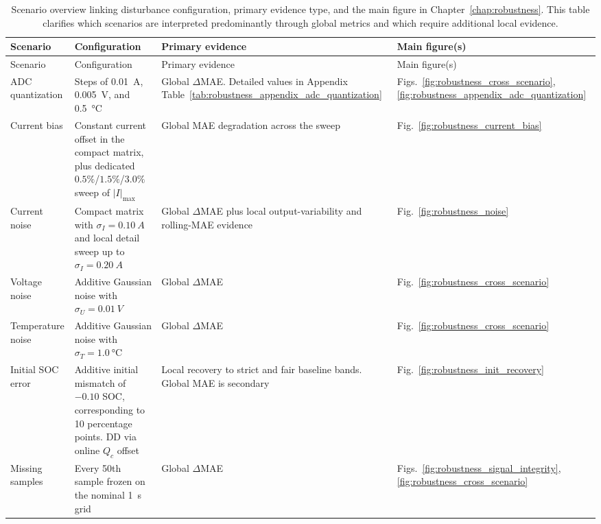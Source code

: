 \documentclass[
    a4paper,
    12pt,
    titlepage,
    bibliography=totoc,
    twoside=on,
    parskip=false,
    numbers=noenddot,
    cleardoublepage=empty,
    DIV=12,
    BCOR=12.0mm,
    headheight=36pt,
    headings=openright
]{scrreprt}
\begin{document}
\begingroup\small
\begin{longtable}{>{\raggedright\arraybackslash}p{2.2cm}>{\raggedright\arraybackslash}p{3.6cm}>{\raggedright\arraybackslash}p{4.4cm}>{\raggedright\arraybackslash}p{3.0cm}}
\caption[Robustness scenario evidence map.]{Scenario overview linking disturbance configuration, primary evidence type, and the main figure in Chapter~\ref{chap:robustness}. This table clarifies which scenarios are interpreted predominantly through global metrics and which require additional local evidence.}\label{tab:robustness_appendix_scenario_overview}\\
\toprule
Scenario & Configuration & Primary evidence & Main figure(s) \\
\midrule
\endfirsthead
\toprule
Scenario & Configuration & Primary evidence & Main figure(s) \\
\midrule
\endhead
ADC quantization & Steps of \SI{0.01}{A}, \SI{0.005}{V}, and \SI{0.5}{\celsius} & Global $\Delta$MAE. Detailed values in Appendix Table~\ref{tab:robustness_appendix_adc_quantization} & Figs.~\ref{fig:robustness_cross_scenario}, \ref{fig:robustness_appendix_adc_quantization} \\
Current bias & Constant current offset in the compact matrix, plus dedicated $0.5\%$/$1.5\%$/$3.0\%$ sweep of $|I|_{\max}$ & Global MAE degradation across the sweep & Fig.~\ref{fig:robustness_current_bias} \\
Current noise & Compact matrix with $\sigma_I=\SI{0.10}{A}$ and local detail sweep up to $\sigma_I=\SI{0.20}{A}$ & Global $\Delta$MAE plus local output-variability and rolling-MAE evidence & Fig.~\ref{fig:robustness_noise} \\
Voltage noise & Additive Gaussian noise with $\sigma_U=\SI{0.01}{V}$ & Global $\Delta$MAE & Fig.~\ref{fig:robustness_cross_scenario} \\
Temperature noise & Additive Gaussian noise with $\sigma_T=\SI{1.0}{\celsius}$ & Global $\Delta$MAE & Fig.~\ref{fig:robustness_cross_scenario} \\
Initial SOC error & Additive initial mismatch of $-0.10$ SOC, corresponding to 10 percentage points. DD via online $Q_c$ offset & Local recovery to strict and fair baseline bands. Global MAE is secondary & Fig.~\ref{fig:robustness_init_recovery} \\
Missing samples & Every 50th sample frozen on the nominal \SI{1}{s} grid & Global $\Delta$MAE & Figs.~\ref{fig:robustness_signal_integrity}, \ref{fig:robustness_cross_scenario} \\

\end{longtable}
\end{document}
